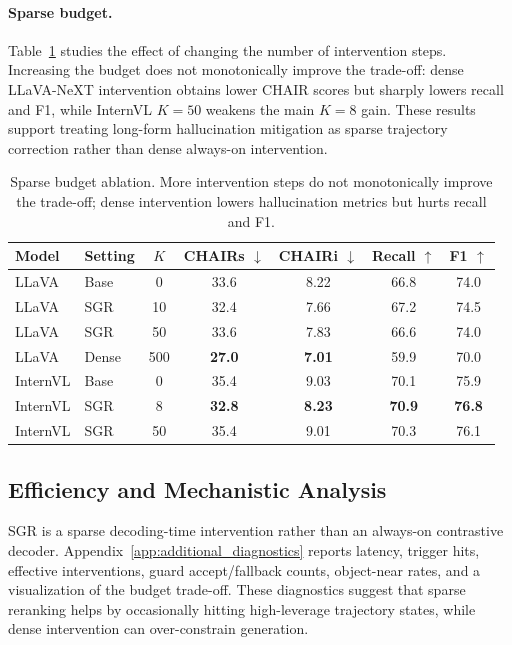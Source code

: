 \documentclass[11pt]{article}
\begin{document}
  \paragraph{Sparse budget.}
  Table~\ref{tab:sparse_budget} studies the effect of changing the number of intervention steps.
  Increasing the budget does not monotonically improve the trade-off: dense LLaVA-NeXT intervention obtains lower CHAIR scores but sharply lowers recall and F1, while InternVL $K=50$ weakens the main $K=8$ gain.
  These results support treating long-form hallucination mitigation as sparse trajectory correction rather than dense always-on intervention.

  \begin{table}[H]
    \centering
    \scriptsize
    \setlength{\tabcolsep}{2.8pt}
    \begin{tabular}{llccccc}
    \hline
    Model & Setting & $K$ & CHAIRs $\downarrow$ & CHAIRi $\downarrow$ & Recall $\uparrow$ & F1 $\uparrow$ \\
    \hline
    LLaVA & Base & 0 & 33.6 & 8.22 & 66.8 & 74.0 \\
    LLaVA & SGR & 10 & 32.4 & 7.66 & 67.2 & 74.5 \\
    LLaVA & SGR & 50 & 33.6 & 7.83 & 66.6 & 74.0 \\
    LLaVA & Dense & 500 & \textbf{27.0} & \textbf{7.01} & 59.9 & 70.0 \\
    \hline
    InternVL & Base & 0 & 35.4 & 9.03 & 70.1 & 75.9 \\
    InternVL & SGR & 8 & \textbf{32.8} & \textbf{8.23} & \textbf{70.9} & \textbf{76.8} \\
    InternVL & SGR & 50 & 35.4 & 9.01 & 70.3 & 76.1 \\
    \hline
    \end{tabular}
    \caption{
    Sparse budget ablation.
    More intervention steps do not monotonically improve the trade-off; dense intervention lowers hallucination metrics but hurts recall and F1.
    }
    \label{tab:sparse_budget}
  \end{table}

\subsection{Efficiency and Mechanistic Analysis}

  SGR is a sparse decoding-time intervention rather than an always-on contrastive decoder.
  Appendix~\ref{app:additional_diagnostics} reports latency, trigger hits, effective interventions, guard accept/fallback counts, object-near rates, and a visualization of the budget trade-off.
  These diagnostics suggest that sparse reranking helps by occasionally hitting high-leverage trajectory states, while dense intervention can over-constrain generation.
\end{document}
